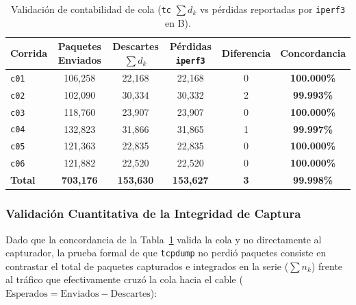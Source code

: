 \documentclass[11pt,a4paper]{article}
\begin{document}
\begin{table}[H]
\centering
\footnotesize
\caption{Validación de contabilidad de cola (\texttt{tc} $\sum d_k$ vs pérdidas reportadas por \texttt{iperf3} en B).}
\label{tab:validacion_descartes}
\begin{tabularx}{\textwidth}{Xccccc}
\toprule
\textbf{Corrida} & \textbf{Paquetes Enviados} & \textbf{Descartes $\sum d_k$} & \textbf{Pérdidas \texttt{iperf3}} & \textbf{Diferencia} & \textbf{Concordancia} \\
\midrule
\texttt{c01} & 106,258 & 22,168 & 22,168 & 0 & \textbf{100.000\%} \\
\texttt{c02} & 102,090 & 30,334 & 30,332 & 2 & \textbf{99.993\%} \\
\texttt{c03} & 118,760 & 23,907 & 23,907 & 0 & \textbf{100.000\%} \\
\texttt{c04} & 132,823 & 31,866 & 31,865 & 1 & \textbf{99.997\%} \\
\texttt{c05} & 121,363 & 22,835 & 22,835 & 0 & \textbf{100.000\%} \\
\texttt{c06} & 121,882 & 22,520 & 22,520 & 0 & \textbf{100.000\%} \\
\midrule
\textbf{Total} & \textbf{703,176} & \textbf{153,630} & \textbf{153,627} & \textbf{3} & \textbf{99.998\%} \\
\bottomrule
\end{tabularx}
\end{table}

\subsubsection{Validación Cuantitativa de la Integridad de Captura}
Dado que la concordancia de la Tabla~\ref{tab:validacion_descartes} valida la cola y no directamente al capturador, la prueba formal de que \texttt{tcpdump} no perdió paquetes consiste en contrastar el total de paquetes capturados e integrados en la serie ($\sum n_k$) frente al tráfico que efectivamente cruzó la cola hacia el cable ($\text{Esperados} = \text{Enviados} - \text{Descartes}$):
\end{document}
